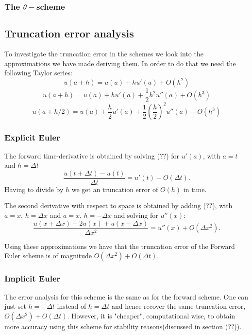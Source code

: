 \documentclass[11pt,a4paper,draft]{article}
\numberwithin{equation}{section}
\begin{document}
\subsubsection{The $\theta-$scheme}

\subsection{Truncation error analysis}

To investigate the truncation error in the schemes we look into the approximations we have made deriving them. In order to do that we need the following Taylor series:
\begin{equation}
u(a+h) = u(a) +hu'(a)+O(h^2)
\end{equation}
\begin{equation}
u(a+h) = u(a) +hu'(a)+\frac{1}{2}h^2 u''(a) +O(h^3)
\end{equation}
\begin{equation}
u(a+h/2) = u(a) +\frac{h}{2}u'(a) + \frac{1}{2} \left( \frac{h}{2} \right)^2 u''(a) + O(h^3)
\end{equation}

\subsubsection{Explicit Euler}
The forward time-derivative is obtained by solving (??) for $u'(a)$, with $a=t$ and $h=\Delta t$
\begin{equation}
\frac{u(t+\Delta t)-u(t)}{\Delta t} = u'(t)+O(\Delta t).
\end{equation}  
Having to divide by $h$ we get an truncation error of $O(h)$ in time.

The second derivative with respect to space is obtained by adding (??), with $a=x$,  $h=\Delta x$ and 
$a=x$,  $h= -\Delta x$ and solving for $u''(x)$:
\begin{equation}
\frac{u(x+\Delta x)-2u(x)+u(x-\Delta x)}{\Delta x^2} = u''(x)+O(\Delta x^2).
\end{equation}  

Using these approximations we have that the truncation error of the Forward Euler scheme is of magnitude $O(\Delta x^2)+O(\Delta t)$.  

\subsubsection{Implicit Euler}
The error analysis for this scheme is the same as for the forward scheme. One can just set $h=- \Delta t$
instead of $h=\Delta t$ and hence recover the same truncation error, $O(\Delta x^2)+O(\Delta t)$. However, it is "cheaper", computational wise, to obtain more accuracy using this scheme for stability reasons(discussed in section (??)). 
\end{document}
